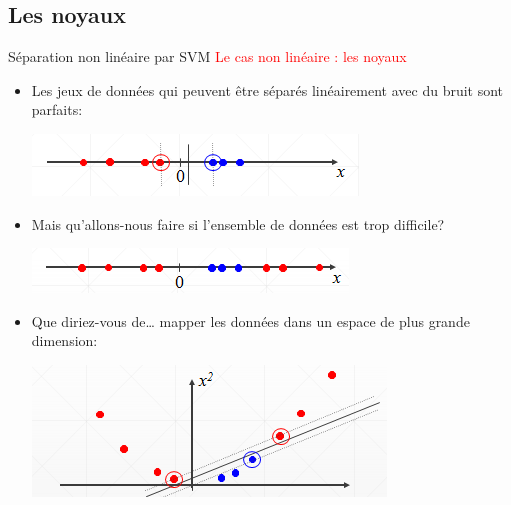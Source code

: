 \documentclass{bredelebeamer}
\begin{document}
\subsection{Les noyaux}
\begin{frame}{Séparation non linéaire par SVM}
\textcolor{red}{Le cas non linéaire : les noyaux }\vspace{1\baselineskip}\\
     \begin{itemize}
      \item Les jeux de données qui peuvent être séparés linéairement avec du bruit sont parfaits:\\
 \begin{center} \includegraphics[scale=0.6]{16.png} \end{center}
      \item Mais qu'allons-nous faire si l'ensemble de données est trop difficile? \\ 
    \begin{center} \includegraphics[scale=0.6]{17.png} \end{center} 
    \item Que diriez-vous de… mapper les données dans un espace de plus grande dimension:\\
       \begin{center} \includegraphics[scale=0.6]{18.png} \end{center} 
\end{itemize}
\end{frame}
\end{document}
